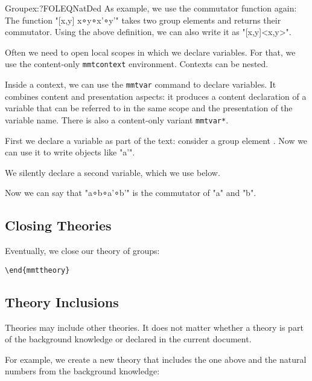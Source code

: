 \documentclass{article}
\begin{document}
\begin{mmttheory}{Group}{ex:?FOLEQNatDed}
As example, we use the commutator function again:
The function "[x,y] x∘y∘x'∘y'" takes two group elements and returns their commutator.
Using the above definition, we can also write it as "[x,y]<x,y>".

Often we need to open local scopes in which we declare variables.
For that, we use the content-only \lstinline|mmtcontext| environment.
Contexts can be nested.

Inside a context, we can use the \lstinline|mmtvar| command to declare variables.
It combines content and presentation aspects: it produces a content declaration of a variable that can be referred to in the same scope and the presentation of the variable name.
There is also a content-only variant \lstinline|mmtvar*|.

\begin{mmtcontext}
First we declare a variable as part of the text: consider a group element .
Now we can use it to write objects like "a'".
\begin{mmtcontext}
We silently declare a second variable, which we use below.

Now we can say that "a∘b∘a'∘b'" is the commutator of "a" and "b".
\end{mmtcontext}
\end{mmtcontext}

\subsection{Closing Theories}

Eventually, we close our theory of groups:

\begin{lstlisting}
\end{mmttheory}
\end{lstlisting}
\end{mmttheory}

\subsection{Theory Inclusions}

Theories may include other theories.
It does not matter whether a theory is part of the background knowledge or declared in the current document.

For example, we create a new theory that includes the one above and the natural numbers from the background knowledge:
\end{document}
